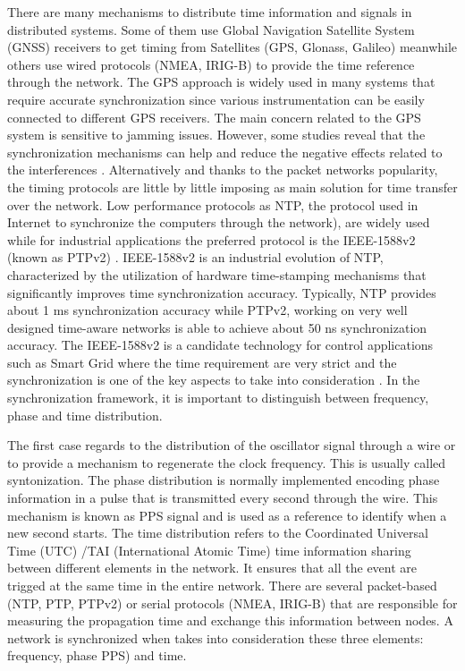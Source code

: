 There are many mechanisms to distribute time information and signals in distributed systems. Some of them use Global Navigation Satellite System (GNSS) receivers to get timing from Satellites (GPS, Glonass, Galileo) meanwhile others use wired protocols (NMEA, IRIG-B) to provide the time reference 
through the network. The GPS approach is widely used in many systems that require accurate synchronization since various instrumentation can be easily connected to different GPS receivers. The main concern related to the GPS system is sensitive to jamming issues. However, some studies reveal that the synchronization mechanisms can help and reduce the negative effects related to the interferences \cite{NOURA2016130}. Alternatively and thanks to the packet networks popularity, the timing protocols are little by little imposing as main solution for time transfer over the network. Low performance protocols as NTP, the protocol used in Internet to synchronize the computers through the network), \cite{ntf:ntp_std} are widely used while for industrial applications the preferred protocol is the IEEE-1588v2 (known as PTPv2) \cite{ieee:ieee1588_std} \cite{itu:TG8275_1_Y_1369_1}. IEEE-1588v2 is an industrial evolution of NTP, characterized by the utilization of hardware time-stamping mechanisms that significantly improves time synchronization accuracy. Typically, NTP provides about 1 ms synchronization accuracy while PTPv2, working on very well designed time-aware networks is able to achieve about 50 ns synchronization accuracy. The IEEE-1588v2 is a candidate technology for control applications such as Smart Grid \cite{NAFI201623} where the time requirement are very strict and the synchronization is one of the key aspects to take into consideration \cite{COLAK2016396}.
In the synchronization framework, it is important to distinguish between frequency, phase and time distribution.

The first case regards to the distribution of the oscillator signal through a wire or to provide a mechanism to regenerate the clock frequency. This is usually  called syntonization. 
The phase distribution is normally implemented encoding phase information in a pulse that is transmitted every second through the wire. This mechanism is known as PPS signal and is used as a reference to identify when a new second starts.
The time distribution refers to the Coordinated Universal Time (UTC) /TAI (International Atomic Time) time information sharing between different elements in the network. It ensures that all the event are trigged at the same time in the entire network. There are several packet-based (NTP, PTP, PTPv2) or serial protocols (NMEA, IRIG-B) that are responsible for measuring the propagation time and exchange this information between nodes. 
A network is synchronized when takes into consideration these three elements: frequency, phase PPS) and time.

